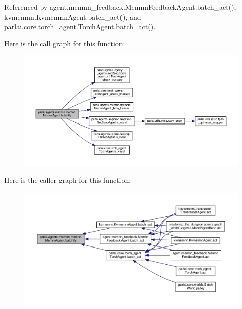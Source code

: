 Referenced by agent.\+memnn\+\_\+feedback.\+Memnn\+Feedback\+Agent.\+batch\+\_\+act(), kvmemnn.\+Kvmemnn\+Agent.\+batch\+\_\+act(), and parlai.\+core.\+torch\+\_\+agent.\+Torch\+Agent.\+batch\+\_\+act().

Here is the call graph for this function\+:
\nopagebreak
\begin{figure}[H]
\begin{center}
\leavevmode
\includegraphics[width=350pt]{classparlai_1_1agents_1_1memnn_1_1memnn_1_1MemnnAgent_a463b88b1d7fc9a7adea9802762c5968c_cgraph}
\end{center}
\end{figure}
Here is the caller graph for this function\+:
\nopagebreak
\begin{figure}[H]
\begin{center}
\leavevmode
\includegraphics[width=350pt]{classparlai_1_1agents_1_1memnn_1_1memnn_1_1MemnnAgent_a463b88b1d7fc9a7adea9802762c5968c_icgraph}
\end{center}
\end{figure}
\mbox{\label{classparlai_1_1agents_1_1memnn_1_1memnn_1_1MemnnAgent_af314871636896b61139ef761765a1872}} 
